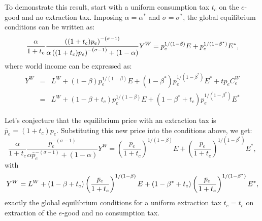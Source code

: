 \documentclass[notitlepage,12pt]{article}
\begin{document}
To demonstrate this result, start with a uniform consumption tax $t_{c}$ on
the $e$-good and no extraction tax. Imposing $\alpha =\alpha ^{\ast }$ and $%
\sigma =\sigma ^{\ast }$, the global equilibrium conditions can be written
as:%
\begin{equation*}
\frac{\alpha }{1+t_{c}}\frac{\left( (1+t_{c})p_{e}\right) ^{-(\sigma -1)}}{%
\alpha \left( (1+t_{c})p_{e}\right) ^{-(\sigma -1)}+(1-\alpha )}%
Y^{W}=p_{e}^{1/(1-\beta )}E+p_{e}^{1/(1-\beta ^{\ast })}E^{\ast },
\end{equation*}%
where world income can be expressed as:%
\begin{eqnarray*}
Y^{W} &=&L^{W}+\left( 1-\beta \right) p_{e}^{1/(1-\beta )}E+\left( 1-\beta
^{\ast }\right) p_{e}^{1/(1-\beta ^{\ast })}E^{\ast }+tp_{e}C_{e}^{W} \\
&=&L^{W}+\left( 1-\beta +t_{c}\right) p_{e}^{1/(1-\beta )}E+\left( 1-\beta
^{\ast }+t_{c}\right) p_{e}^{1/(1-\beta ^{\ast })}E^{\ast }
\end{eqnarray*}

Let's conjecture that the equilibrium price with an extraction tax is $\bar{p%
}_{e}=(1+t_{c})p_{e}$. Substituting this new price into the conditions
above, we get:%
\begin{equation*}
\frac{\alpha }{1+t_{c}}\frac{\bar{p}_{e}^{-(\sigma -1)}}{\alpha \bar{p}%
_{e}^{-(\sigma -1)}+(1-\alpha )}Y^{W}=\left( \frac{\bar{p}_{e}}{1+t_{c}}%
\right) ^{1/(1-\beta )}E+\left( \frac{\bar{p}_{e}}{1+t_{c}}\right)
^{1/(1-\beta ^{\ast })}E^{\ast },
\end{equation*}%
with%
\begin{equation*}
Y^{W}=L^{W}+\left( 1-\beta +t_{c}\right) \left( \frac{\bar{p}_{e}}{1+t_{c}}%
\right) ^{1/(1-\beta )}E+\left( 1-\beta ^{\ast }+t_{c}\right) \left( \frac{%
\bar{p}_{e}}{1+t_{c}}\right) ^{1/(1-\beta ^{\ast })}E^{\ast },
\end{equation*}%
exactly the global equilibrium conditions for a uniform extraction tax $%
t_{e}=t_{c}$ on extraction of the $e$-good and no consumption tax.
\end{document}
